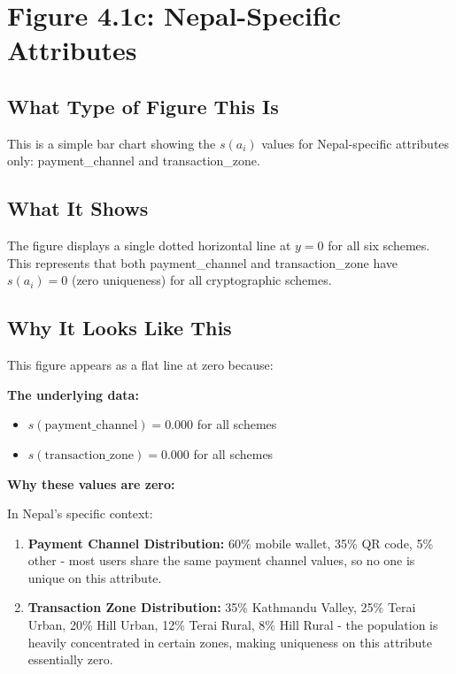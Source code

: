 \documentclass[12pt,a4paper,oneside,openany]{report}
\begin{document}
\section{Figure 4.1c: Nepal-Specific Attributes}
\label{sec:f4.1c}

\subsection{What Type of Figure This Is}
This is a simple bar chart showing the $s(a_i)$ values for Nepal-specific attributes only: payment\_channel and transaction\_zone.

\subsection{What It Shows}
The figure displays a single dotted horizontal line at $y = 0$ for all six schemes. This represents that both payment\_channel and transaction\_zone have $s(a_i) = 0$ (zero uniqueness) for all cryptographic schemes.

\subsection{Why It Looks Like This}
This figure appears as a flat line at zero because:

\textbf{The underlying data:}
\begin{itemize}
    \item $s(\text{payment\_channel}) = 0.000$ for all schemes
    \item $s(\text{transaction\_zone}) = 0.000$ for all schemes
\end{itemize}

\textbf{Why these values are zero:}

In Nepal's specific context:
\begin{enumerate}
    \item \textbf{Payment Channel Distribution:} 60\% mobile wallet, 35\% QR code, 5\% other - most users share the same payment channel values, so no one is unique on this attribute.
    \item \textbf{Transaction Zone Distribution:} 35\% Kathmandu Valley, 25\% Terai Urban, 20\% Hill Urban, 12\% Terai Rural, 8\% Hill Rural - the population is heavily concentrated in certain zones, making uniqueness on this attribute essentially zero.
\end{enumerate}
\end{document}
